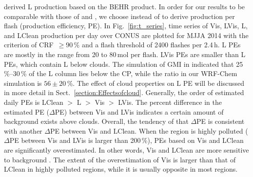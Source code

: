 \documentclass[amt]{copernicus}
\begin{document}
\citet{Lapierre.2020} derived L production based on the BEHR  product.
In order for our results to be comparable with those of \citet{Pickering.2016} and \citet{Lapierre.2020},
we choose  instead of  to derive production per flash (production efficiency, PE).
In Fig.~\ref{fig:t_series}, time series of Vis, LVis, L, and LClean production per day over CONUS are plotted for MJJA 2014 with the criterion of CRF~$\geq 90$\,{\%} and a flash threshold of 2400 flashes per 2.4\,h.
L PEs are mostly in the range from 20 to 80\,mol per flash.
LVis PEs are smaller than L PEs, which contain L below clouds.
The simulation of GMI in \citet{Pickering.2016} indicated that 25\,{\%}--30\,{\%} of the L column lies below the CP, while the ratio in our WRF-Chem simulation is $56\pm 20$\,{\%}.
The effect of cloud properties on L PE will be discussed in more detail in Sect.~\ref{section:Effectsofcloud}.
Generally, the order of estimated daily PEs is LClean $>$ L $>$ Vis $>$ LVis.
The percent difference in the estimated PE ($\Delta$PE) between Vis and LVis indicates a certain amount of background  exists above clouds.
Overall, the tendency of that $\Delta$PE is consistent with another $\Delta$PE between Vis and LClean.
When the region is highly polluted ($\Delta$PE between Vis and LVis is larger than 200\,{\%}), PEs based on Vis and LClean are significantly overestimated.
In other words, Vis and LClean are more sensitive to background .
The extent of the overestimation of Vis is larger than that of LClean in highly polluted regions, while it is usually opposite in most regions.
\end{document}
